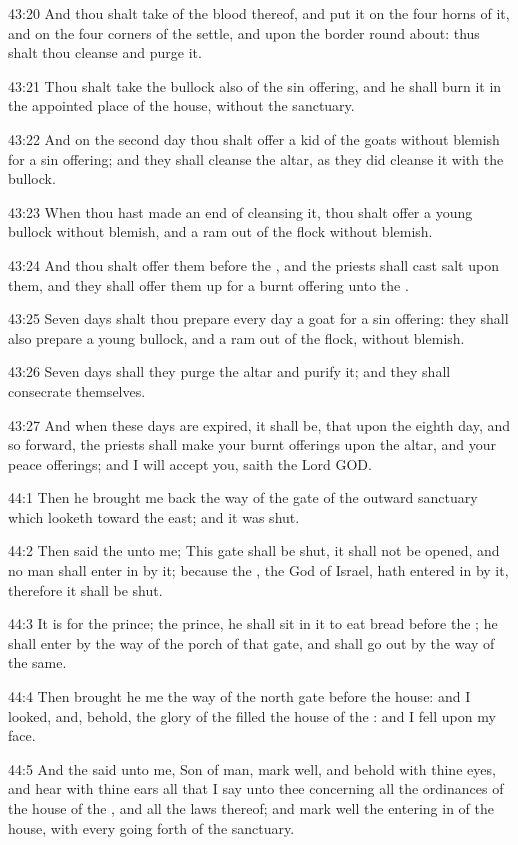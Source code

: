 43:20 And thou shalt take of the blood thereof, and put it on the four
horns of it, and on the four corners of the settle, and upon the
border round about: thus shalt thou cleanse and purge it.

43:21 Thou shalt take the bullock also of the sin offering, and he
shall burn it in the appointed place of the house, without the
sanctuary.

43:22 And on the second day thou shalt offer a kid of the goats
without blemish for a sin offering; and they shall cleanse the altar,
as they did cleanse it with the bullock.

43:23 When thou hast made an end of cleansing it, thou shalt offer a
young bullock without blemish, and a ram out of the flock without
blemish.

43:24 And thou shalt offer them before the \LORD, and the priests shall
cast salt upon them, and they shall offer them up for a burnt offering
unto the \LORD.

43:25 Seven days shalt thou prepare every day a goat for a sin
offering: they shall also prepare a young bullock, and a ram out of
the flock, without blemish.

43:26 Seven days shall they purge the altar and purify it; and they
shall consecrate themselves.

43:27 And when these days are expired, it shall be, that upon the
eighth day, and so forward, the priests shall make your burnt
offerings upon the altar, and your peace offerings; and I will accept
you, saith the Lord GOD.

44:1 Then he brought me back the way of the gate of the outward
sanctuary which looketh toward the east; and it was shut.

44:2 Then said the \LORD unto me; This gate shall be shut, it shall not
be opened, and no man shall enter in by it; because the \LORD, the God
of Israel, hath entered in by it, therefore it shall be shut.

44:3 It is for the prince; the prince, he shall sit in it to eat bread
before the \LORD; he shall enter by the way of the porch of that gate,
and shall go out by the way of the same.

44:4 Then brought he me the way of the north gate before the house:
and I looked, and, behold, the glory of the \LORD filled the house of
the \LORD: and I fell upon my face.

44:5 And the \LORD said unto me, Son of man, mark well, and behold with
thine eyes, and hear with thine ears all that I say unto thee
concerning all the ordinances of the house of the \LORD, and all the
laws thereof; and mark well the entering in of the house, with every
going forth of the sanctuary.

